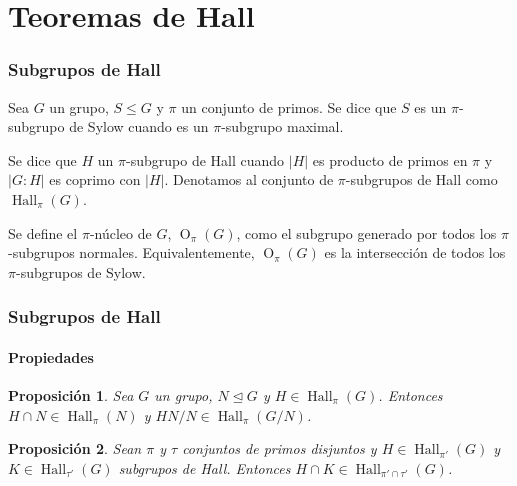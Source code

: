 \documentclass[
	11pt, %
]{beamer}
\DeclareMathOperator{\SylowSubgroup}{Syl}
\DeclareMathOperator{\HallSubgroup}{Hall}
\DeclareMathOperator{\OSubgroup}{O}
\newcommand{\Syl}[2]{\SylowSubgroup_{#1}(#2)}
\newcommand{\Hall}[2]{\HallSubgroup_{#1}(#2)}
\newcommand{\Core}[2]{\OSubgroup_{#1}(#2)}
\newcommand{\norm}{\trianglelefteq}
\newcommand{\ord}[1]{\left|#1\right|}%
\newtheorem{proposition}{Proposici\'on}
\begin{document}
\section{Teoremas de Hall}

\begin{frame}
	\frametitle{Subgrupos de Hall}
	
	\begin{definition}
		Sea $G$ un grupo, $S\leq G$ y $\pi$ un conjunto de primos. Se dice que $S$ es un $\pi$-subgrupo de Sylow cuando es un $\pi$-subgrupo maximal. %
	\end{definition}
	\begin{definition}
		Se dice que $H$ un $\pi$-subgrupo de Hall cuando $\ord{H}$ es producto de primos en $\pi$ y $\ord{G:H}$ es coprimo con $\ord H$. Denotamos al conjunto de $\pi$-subgrupos de Hall como $\Hall \pi G$.
	\end{definition}
	\smallskip %
	
	\begin{definition}
		Se define el $\pi$-núcleo de $G$, $\Core \pi G$, como el subgrupo generado por todos los $\pi$-subgrupos normales. Equivalentemente, $\Core \pi G$ es la intersección de todos los $\pi$-subgrupos de Sylow.
	\end{definition}  
	
\end{frame}

\begin{frame}
	\frametitle{Subgrupos de Hall}
	\framesubtitle{Propiedades}

	\begin{proposition}
		Sea $G$ un grupo, $N\norm G$ y $H\in \Hall \pi G$. Entonces $H\cap N \in \Hall \pi {N}$ y $HN/N\in \Hall \pi{ G/N}$.
	\end{proposition}
	
	\begin{proposition}
		Sean $\pi$ y $\tau$ conjuntos de primos disjuntos y $H\in \Hall {\pi'} G$ y $K\in \Hall {\tau'} G$ subgrupos de Hall. Entonces $H\cap K\in \Hall {\pi'\cap\tau'} G$.
	\end{proposition}
	
\end{frame}
\end{document}
